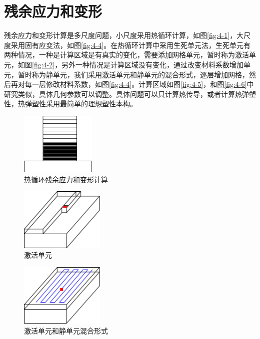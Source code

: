 \chapter{残余应力和变形}

残余应力和变形计算是多尺度问题，小尺度采用热循环计算，如图\ref{fig:4-1}，大尺度采用固有应变法，如图\ref{fig:4-4}。在热循环计算中采用生死单元法，生死单元有两种情况，一种是计算区域是有真实的变化，需要添加网格单元，暂时称为激活单元，如图\ref{fig:4-2}，另外一种情况是计算区域没有变化，通过改变材料系数增加单元，暂时称为静单元，我们采用激活单元和静单元的混合形式，逐层增加网格，然后再对每一层修改材料系数，如图\ref{fig:4-4}。计算区域如图\ref{fig:4-5}，和图\ref{fig:4-6}中研究类似，具体几何参数可以调整。具体问题可以只计算热传导，或者计算热弹塑性，热弹塑性采用最简单的理想塑性本构。

\begin{figure}[!htbp]
  \centering
  \includegraphics[height=3cm]{fig/4/1.png}
  \caption{热循环残余应力和变形计算}
  \label{fig:4.1.1:1}
\end{figure}

\begin{figure}[!htbp]
  \centering
  \includegraphics[height=3cm]{fig/4/2.png}
  \caption{激活单元}
  \label{fig:4.1.1:2}
\end{figure}

\begin{figure}[!htbp]
  \centering
  \includegraphics[height=3cm]{fig/4/3.png}
  \caption{激活单元和静单元混合形式}
  \label{fig:4.1.1:3}
\end{figure}

